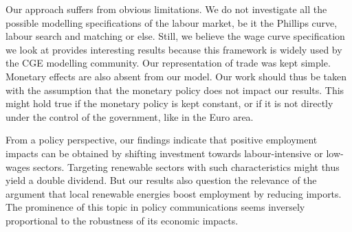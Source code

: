 Our approach suffers from obvious limitations. We do not investigate all the possible modelling specifications of the labour market, be it the Phillips curve, labour search and matching or else. Still, we believe the wage curve specification we look at provides interesting results because this framework is widely used by the CGE modelling community.
Our representation of trade was kept simple. Monetary effects are also absent from our model. Our work should thus be taken with the assumption that the monetary policy does not impact our results. This might hold true if the monetary policy is kept constant, or if it is not directly under the control of the government, like in the Euro area.

From a policy perspective, our findings indicate that positive employment impacts can be obtained by shifting investment towards labour-intensive or low-wages sectors. Targeting renewable sectors with such characteristics might thus yield a double dividend.
But our results also question the relevance of the argument that local renewable energies boost employment by reducing imports. The prominence of this topic in policy communications seems inversely proportional to the robustness of its economic impacts. 

